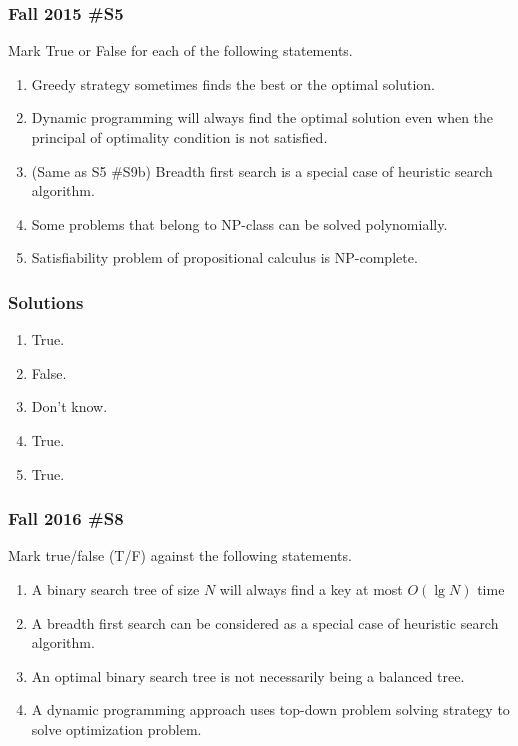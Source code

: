 \subsubsection{Fall 2015 \#S5}


	Mark True or False for each of the following statements.  
	
	\begin{enumerate}[label=\alph*.]
		\item Greedy strategy sometimes finds the best or the optimal solution.
		\item Dynamic programming will always find the optimal solution even when the principal of optimality condition is not satisfied.
		\item (Same as S5 \#S9b) Breadth first search is a special case of heuristic search algorithm.
		\item Some problems that belong to NP-class can be solved polynomially.  
		\item Satisfiability problem of propositional calculus is NP-complete.
	\end{enumerate}

\subsubsection{Solutions}

\begin{enumerate}[label=\alph*.]
	\item True.
	\item False.
	\item Don't know.  
	\item True.
	\item True.
\end{enumerate}

\subsubsection{Fall 2016 \#S8}

	Mark true/false (T/F) against the following statements.  
	
	\begin{enumerate}
		\item A binary search tree of size $N$ will always find a key at most $O(\lg N)$ time
		\item A breadth first search can be considered as a special case of heuristic search algorithm.
		\item An optimal binary search tree is not necessarily being a balanced tree.
		\item A dynamic programming approach uses top-down problem solving strategy to solve optimization problem.
	\end{enumerate}
	
